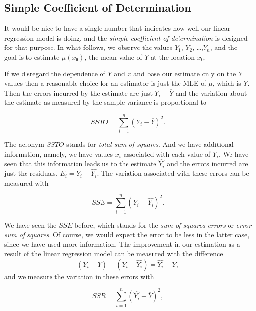 \documentclass[]{book}
\numberwithin{equation}{chapter}
\numberwithin{figure}{chapter}
\theoremstyle{plain}
\theoremstyle{definition}
\theoremstyle{remark}
\theoremstyle{definition}
\theoremstyle{definition}
\theoremstyle{remark}
\begin{document}
\subsection{Simple Coefficient of
Determination}\label{simple-coefficient-of-determination}

It would be nice to have a single number that indicates how well our
linear regression model is doing, and the \emph{simple coefficient of
determination} is designed for that purpose. In what follows, we observe
the values \(Y_{1}\), \(Y_{2}\), \ldots{},\(Y_{n}\), and the goal is to
estimate \(\mu(x_{0})\), the mean value of \(Y\) at the location
\(x_{0}\).

If we disregard the dependence of \(Y\) and \(x\) and base our estimate
only on the \(Y\) values then a reasonable choice for an estimator is
just the MLE of \(\mu\), which is \(\overline{Y}\). Then the errors
incurred by the estimate are just \(Y_{i}-\overline{Y}\) and the
variation about the estimate as measured by the sample variance is
proportional to

\begin{equation}
SSTO=\sum_{i=1}^{n}(Y_{i}-\overline{Y})^{2}.
\end{equation}

The acronym \(SSTO\) stands for \emph{total sum of squares}. And we have
additional information, namely, we have values \(x_{i}\) associated with
each value of \(Y_{i}\). We have seen that this information leads us to
the estimate \(\hat{Y_{i}}\) and the errors incurred are just the
residuals, \(E_{i}=Y_{i}-\hat{Y_{i}}\). The variation associated with
these errors can be measured with

\begin{equation}
SSE=\sum_{i=1}^{n}(Y_{i}-\hat{Y_{i}})^{2}.
\end{equation}

We have seen the \(SSE\) before, which stands for the \emph{sum of
squared errors} or \emph{error sum of squares}. Of course, we would
expect the error to be less in the latter case, since we have used more
information. The improvement in our estimation as a result of the linear
regression model can be measured with the difference \[
(Y_{i}-\overline{Y})-(Y_{i}-\hat{Y_{i}})=\hat{Y_{i}}-\overline{Y}, \]
and we measure the variation in these errors with

\begin{equation}
SSR=\sum_{i=1}^{n}(\hat{Y_{i}}-\overline{Y})^{2},
\end{equation}
\end{document}
